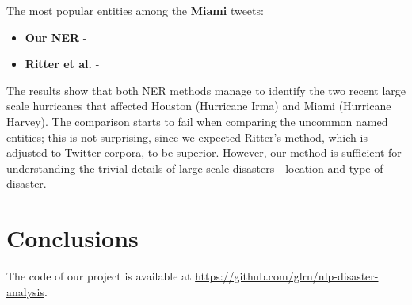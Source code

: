 \documentclass[letterpaper,twocolumn,10pt]{article}
\begin{document}
The most popular entities among the \textbf{Miami} tweets:

\begin{itemize}[noitemsep]
	\item\textbf{Our NER} - 
	\item\textbf{Ritter et al.} - 
	
\end{itemize}


The results show that both NER methods manage to identify the two recent large scale hurricanes that affected Houston (Hurricane Irma) and Miami (Hurricane Harvey).
The comparison starts to fail when comparing the uncommon named entities; this is not surprising, since we expected Ritter's method, which is adjusted to Twitter corpora, to be superior. However, our method is sufficient for understanding the trivial details of large-scale disasters - location and type of disaster.

\section{Conclusions}


The code of our project is available at \url{https://github.com/glrn/nlp-disaster-analysis}.



{\footnotesize 
}

\theendnotes
\end{document}
